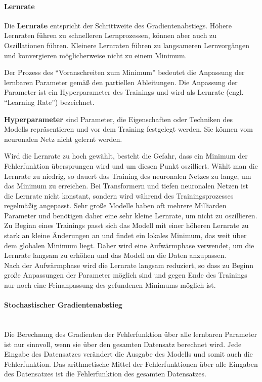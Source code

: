 \paragraph{Lernrate}
\begin{definition}\label{def:lernrate}
    Die \textbf{Lernrate} entspricht der Schrittweite des Gradientenabstiegs. Höhere Lernraten führen zu schnelleren Lernprozessen, können aber auch zu Oszillationen führen.
    Kleinere Lernraten führen zu langsameren Lernvorgängen und konvergieren möglicherweise nicht zu einem Minimum.
\end{definition}
Der Prozess des \enquote{Voranschreiten zum Minimum} bedeutet die Anpassung der lernbaren Parameter gemäß den partiellen Ableitungen.
Die Anpassung der Parameter ist ein Hyperparameter des Trainings und wird als Lernrate (engl. \enquote{Learning Rate}) bezeichnet.\\

\begin{definition}\label{def:hyperparameter}
    \textbf{Hyperparameter} sind Parameter, die Eigenschaften oder Techniken des Modells repräsentieren und vor dem Training festgelegt werden.
    Sie können vom neuronalen Netz nicht gelernt werden.
\end{definition}

Wird die Lernrate zu hoch gewählt, besteht die Gefahr, dass ein Minimum der Fehlerfunktion übersprungen wird und um diesen Punkt oszilliert.
Wählt man die Lernrate zu niedrig, so dauert das Training des neuronalen Netzes zu lange, um das Minimum zu erreichen.
Bei Transformern und tiefen neuronalen Netzen ist die Lernrate nicht konstant, sondern wird während des Trainingsprozesses regelmäßig angepasst.
Sehr große Modelle haben oft mehrere Milliarden Parameter und benötigen daher eine sehr kleine Lernrate, um nicht zu oszillieren.
Zu Beginn eines Trainings passt sich das Modell mit einer höheren Lernrate zu stark an kleine Änderungen an und findet ein lokales Minimum, das weit über dem globalen Minimum liegt.
Daher wird eine Aufwärmphase verwendet, um die Lernrate langsam zu erhöhen und das Modell an die Daten anzupassen.\\

Nach der Aufwärmphase wird die Lernrate langsam reduziert, so dass zu Beginn große Anpassungen der Parameter möglich sind und gegen Ende des Trainings nur noch eine Feinanpassung des gefundenen Minimums möglich ist.\\

\paragraph{Stochastischer Gradientenabstieg}\mbox{}\\
Die Berechnung des Gradienten der Fehlerfunktion über alle lernbaren Parameter ist nur sinnvoll, wenn sie über den gesamten Datensatz berechnet wird.
Jede Eingabe des Datensatzes verändert die Ausgabe des Modells und somit auch die Fehlerfunktion.
Das arithmetische Mittel der Fehlerfunktionen über alle Eingaben des Datensatzes ist die Fehlerfunktion des gesamten Datensatzes.

